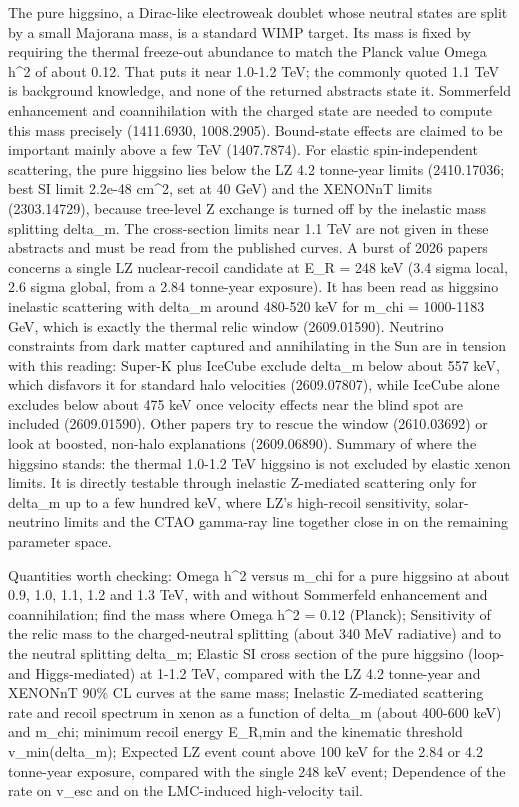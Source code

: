 \documentclass[11pt,a4paper]{article}
\begin{document}
The pure higgsino, a Dirac-like electroweak doublet whose neutral states are split by a small Majorana mass, is a standard WIMP target. Its mass is fixed by requiring the thermal freeze-out abundance to match the Planck value Omega h\textasciicircum{}2 of about 0.12. That puts it near 1.0-1.2 TeV; the commonly quoted 1.1 TeV is background knowledge, and none of the returned abstracts state it. Sommerfeld enhancement and coannihilation with the charged state are needed to compute this mass precisely (1411.6930, 1008.2905). Bound-state effects are claimed to be important mainly above a few TeV (1407.7874). For elastic spin-independent scattering, the pure higgsino lies below the LZ 4.2 tonne-year limits (2410.17036; best SI limit 2.2e-48 cm\textasciicircum{}2, set at 40 GeV) and the XENONnT limits (2303.14729), because tree-level Z exchange is turned off by the inelastic mass splitting delta\_m. The cross-section limits near 1.1 TeV are not given in these abstracts and must be read from the published curves. A burst of 2026 papers concerns a single LZ nuclear-recoil candidate at E\_R = 248 keV (3.4 sigma local, 2.6 sigma global, from a 2.84 tonne-year exposure). It has been read as higgsino inelastic scattering with delta\_m around 480-520 keV for m\_chi = 1000-1183 GeV, which is exactly the thermal relic window (2609.01590). Neutrino constraints from dark matter captured and annihilating in the Sun are in tension with this reading: Super-K plus IceCube exclude delta\_m below about 557 keV, which disfavors it for standard halo velocities (2609.07807), while IceCube alone excludes below about 475 keV once velocity effects near the blind spot are included (2609.01590). Other papers try to rescue the window (2610.03692) or look at boosted, non-halo explanations (2609.06890). Summary of where the higgsino stands: the thermal 1.0-1.2 TeV higgsino is not excluded by elastic xenon limits. It is directly testable through inelastic Z-mediated scattering only for delta\_m up to a few hundred keV, where LZ's high-recoil sensitivity, solar-neutrino limits and the CTAO gamma-ray line together close in on the remaining parameter space.

Quantities worth checking: Omega h\textasciicircum{}2 versus m\_chi for a pure higgsino at about 0.9, 1.0, 1.1, 1.2 and 1.3 TeV, with and without Sommerfeld enhancement and coannihilation; find the mass where Omega h\textasciicircum{}2 = 0.12 (Planck); Sensitivity of the relic mass to the charged-neutral splitting (about 340 MeV radiative) and to the neutral splitting delta\_m; Elastic SI cross section of the pure higgsino (loop- and Higgs-mediated) at 1-1.2 TeV, compared with the LZ 4.2 tonne-year and XENONnT 90\% CL curves at the same mass; Inelastic Z-mediated scattering rate and recoil spectrum in xenon as a function of delta\_m (about 400-600 keV) and m\_chi; minimum recoil energy E\_R,min and the kinematic threshold v\_min(delta\_m); Expected LZ event count above 100 keV for the 2.84 or 4.2 tonne-year exposure, compared with the single 248 keV event; Dependence of the rate on v\_esc and on the LMC-induced high-velocity tail.
\end{document}
